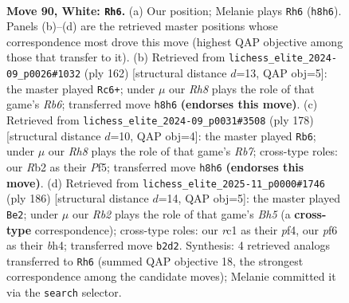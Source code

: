 \documentclass[11pt]{article}
\begin{document}
\clearpage

\begin{figure}[p]\centering
\begin{subfigure}{0.46\textwidth}\centering
\resizebox{\linewidth}{!}{%
\newchessgame
\chessboard[
  setfen={7R/3k4/4pp2/8/P3P3/5PK1/1R6/2r5 w - - 6 90},
  showmover=false,
  pgfstyle=straightmove, color=movearrow, markmove={h8-h6}
]}
\caption{}
\end{subfigure}\hfill
\begin{subfigure}{0.46\textwidth}\centering
\resizebox{\linewidth}{!}{%
\newchessgame
\chessboard[
  setfen={8/3r4/1R4p1/6P1/4P3/2k1K3/2p5/8 w - - 8 82},
  showmover=false,
  pgfstyle=straightmove, color=movearrow, markmove={b6-c6}
]}
\caption{}
\end{subfigure}
\\[4pt]
\begin{subfigure}{0.46\textwidth}\centering
\resizebox{\linewidth}{!}{%
\newchessgame
\chessboard[
  setfen={6k1/1R6/5p1p/5P1P/6P1/5K2/8/r7 w - - 89 90},
  showmover=false,
  pgfstyle=straightmove, color=movearrow, markmove={b7-b6}
]}
\caption{}
\end{subfigure}\hfill
\begin{subfigure}{0.46\textwidth}\centering
\resizebox{\linewidth}{!}{%
\newchessgame
\chessboard[
  setfen={8/kp6/3P4/2P4B/2K2p1b/8/8/8 w - - 3 94},
  showmover=false,
  pgfstyle=straightmove, color=movearrow, markmove={h5-e2}
]}
\caption{}
\end{subfigure}
\caption{\textbf{Move 90, White: \texttt{Rh6}.} (a) Our position; Melanie plays \texttt{Rh6} (\texttt{h8h6}). Panels (b)--(d) are the retrieved master positions whose correspondence most drove this move (highest QAP objective among those that transfer to it). (b) Retrieved from \texttt{lichess\_elite\_2024-09\_p0026\#1032} (ply 162) [structural distance $d$=13, QAP obj=5]: the master played \texttt{Rc6+}; under $\mu$ our \emph{Rh8} plays the role of that game's \emph{Rb6}; transferred move \texttt{h8h6} \textbf{(endorses this move)}. (c) Retrieved from \texttt{lichess\_elite\_2024-09\_p0031\#3508} (ply 178) [structural distance $d$=10, QAP obj=4]: the master played \texttt{Rb6}; under $\mu$ our \emph{Rh8} plays the role of that game's \emph{Rb7}; cross-type roles: our \emph{R}b2 as their \emph{P}f5; transferred move \texttt{h8h6} \textbf{(endorses this move)}. (d) Retrieved from \texttt{lichess\_elite\_2025-11\_p0000\#1746} (ply 186) [structural distance $d$=14, QAP obj=5]: the master played \texttt{Be2}; under $\mu$ our \emph{Rb2} plays the role of that game's \emph{Bh5} (a \textbf{cross-type} correspondence); cross-type roles: our \emph{r}c1 as their \emph{p}f4, our \emph{p}f6 as their \emph{b}h4; transferred move \texttt{b2d2}. Synthesis: 4 retrieved analogs transferred to \texttt{Rh6} (summed QAP objective 18, the strongest correspondence among the candidate moves); Melanie committed it via the \texttt{search} selector.}
\label{fig:thought-m178}
\end{figure}
\end{document}
